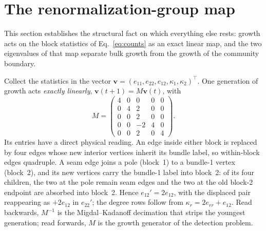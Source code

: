 \documentclass[preprint,12pt]{elsarticle}
\begin{document}
\section{The renormalization-group map}
\label{sec:rgmap}

This section establishes the structural fact on which everything else rests:
growth acts on the block statistics of Eq.~\eqref{eq:counts} as an exact linear
map, and the two eigenvalues of that map separate bulk growth from the growth
of the community boundary.

Collect the statistics in the vector
$\bm v=(e_{11},e_{22},e_{12},\kappa_1,\kappa_2)^{\top}$. One generation of
growth acts \emph{exactly linearly}, $\bm v(t{+}1)=M\bm v(t)$, with
\begin{equation}
  M=\begin{pmatrix}
     4&0&0&0&0\\ 0&4&2&0&0\\ 0&0&2&0&0\\ 0&0&-2&4&0\\ 0&0&2&0&4
    \end{pmatrix}.
  \label{eq:M}
\end{equation}
Its entries have a direct physical reading. An edge inside either block is
replaced by four edges whose new interior vertices inherit its bundle label, so
within-block edges quadruple. A seam edge joins a pole (block~1) to a
bundle-1 vertex (block~2), and its new vertices carry the bundle-1 label into
block~2: of its four children, the two at the pole remain seam edges and the
two at the old block-2 endpoint are absorbed into block~2. Hence
$e_{12}'=2e_{12}$, with the displaced pair reappearing as $+2e_{12}$ in
$e_{22}'$; the degree rows follow from $\kappa_r=2e_{rr}+e_{12}$. Read
backwards, $M^{-1}$ is the Migdal--Kadanoff decimation that strips the youngest
generation; read forwards, $M$ is the growth generator of the detection
problem.
\end{document}
